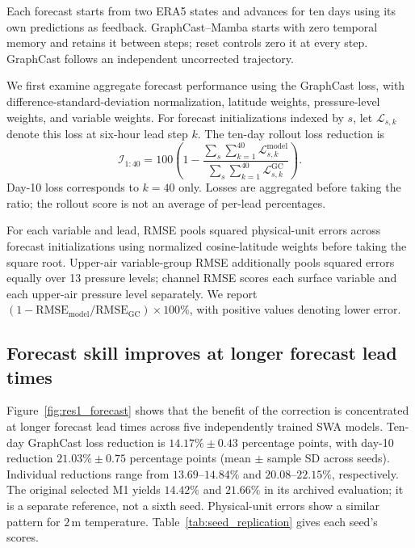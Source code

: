 \documentclass{article}
\newcommand{\vfourchange}[1]{{\color{blue}#1}}
\begin{document}
Each forecast starts from two ERA5 states and advances for ten days using its own predictions as feedback. GraphCast--Mamba starts with zero temporal memory and retains it between steps; reset controls zero it at every step. GraphCast follows an independent uncorrected trajectory.

We first examine aggregate forecast performance using the {GraphCast loss}, with difference-standard-deviation normalization, latitude weights, pressure-level weights, and variable weights. For forecast initializations indexed by $s$, let $\mathcal{L}_{s,k}$ denote this loss at six-hour lead step $k$. The ten-day rollout loss reduction is
\begin{equation}
    \mathcal{I}_{1:40}=100\left(1-
    \frac{\sum_s\sum_{k=1}^{40}\mathcal{L}^{\mathrm{model}}_{s,k}}
         {\sum_s\sum_{k=1}^{40}\mathcal{L}^{\mathrm{GC}}_{s,k}}\right).
    \label{eq:v3_loss_reduction}
\end{equation}
Day-10 loss corresponds to $k=40$ only. Losses are aggregated before taking the ratio; the rollout score is not an average of per-lead percentages.

For each variable and lead, RMSE pools squared physical-unit errors across forecast initializations using normalized cosine-latitude weights before taking the square root. Upper-air variable-group RMSE additionally pools squared errors equally over 13 pressure levels; channel RMSE scores each surface variable and each upper-air pressure level separately. We report $(1-\mathrm{RMSE}_{\mathrm{model}}/\mathrm{RMSE}_{\mathrm{GC}})\times 100\%$, with positive values denoting lower error.

\subsection{Forecast skill improves at longer forecast lead times}

Figure~\ref{fig:res1_forecast} shows that the benefit of the correction is concentrated at longer forecast lead times\vfourchange{ across five independently trained SWA models}. \vfourchange{Ten-day GraphCast loss reduction is $14.17\%\pm0.43$ percentage points, with day-10 reduction $21.03\%\pm0.75$ percentage points (mean $\pm$ sample SD across seeds). Individual reductions range from $13.69$--$14.84\%$ and $20.08$--$22.15\%$, respectively. The original selected M1 yields $14.42\%$ and $21.66\%$ in its archived evaluation; it is a separate reference, not a sixth seed.} Physical-unit errors show a similar pattern\vfourchange{ for $2$\,m temperature}. \vfourchange{Table~\ref{tab:seed_replication} gives each seed's scores.}
\end{document}
